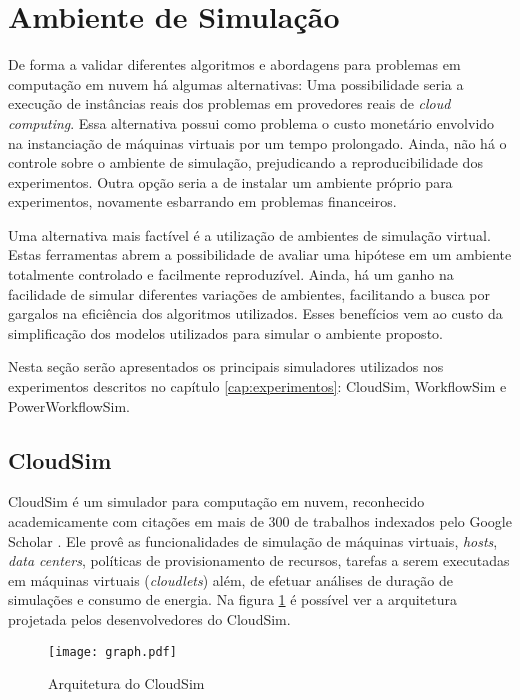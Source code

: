 \section{Ambiente de Simulação}
\label{sec:ambiente_simulacao}
De forma a validar diferentes algoritmos e abordagens para problemas em computação
em nuvem há algumas alternativas: Uma possibilidade seria a execução de instâncias
reais dos problemas em provedores reais de \emph{cloud computing}. Essa alternativa
possui como problema o custo monetário envolvido na instanciação de máquinas
virtuais por um tempo prolongado. Ainda, não há o controle sobre o ambiente 
de simulação, prejudicando a reproducibilidade dos experimentos. Outra opção
seria a de instalar um ambiente próprio para experimentos, novamente esbarrando
em problemas financeiros. 

Uma alternativa mais factível é a utilização de ambientes de simulação virtual.
Estas ferramentas abrem a possibilidade de avaliar uma hipótese em um ambiente
totalmente controlado e facilmente reproduzível. Ainda, há um ganho na facilidade
de simular diferentes variações de ambientes, facilitando a busca por gargalos
na eficiência dos algoritmos utilizados. Esses benefícios vem ao custo da
simplificação dos modelos utilizados para simular o ambiente proposto.

Nesta seção serão apresentados os principais simuladores utilizados nos 
experimentos descritos no capítulo \ref{cap:experimentos}: CloudSim, WorkflowSim
e PowerWorkflowSim.

\subsection{CloudSim}
CloudSim \cite{calheiros:cloudsim} é um simulador para computação em nuvem,
reconhecido academicamente com citações em mais de 300 de trabalhos indexados
pelo Google Scholar \cite{google:cloudsim}. Ele provê as funcionalidades
de simulação de máquinas virtuais, \emph{hosts}, \emph{data centers}, políticas
de provisionamento de recursos, tarefas a serem executadas em máquinas virtuais
(\emph{cloudlets}) além, de efetuar análises de duração de simulações e consumo
de energia. Na figura \ref{fig:arquitetura_cloudsim} é possível ver a arquitetura projetada
pelos desenvolvedores do CloudSim. 

\begin{figure}
\centering
\texttt{[image: graph.pdf]}
\caption{Arquitetura do CloudSim}
\label{fig:arquitetura_cloudsim}
\end{figure}

